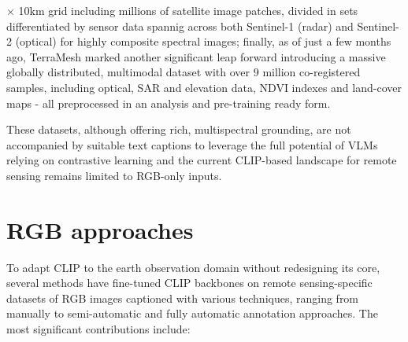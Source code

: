 \documentclass[a4paper, oneside, english]{sapthesis} %
\begin{document}
$\times$ 10km grid including millions of satellite image patches, divided in sets differentiated by sensor data spannig across both Sentinel-1 (radar) and Sentinel-2 (optical) for highly composite spectral images; finally, as of just a few months ago, TerraMesh \cite{blumenstiel2025terramesh} marked another significant leap forward introducing a massive globally distributed, multimodal dataset with over $9$ million co-registered samples, including optical, SAR and elevation data, NDVI indexes and land-cover maps - all preprocessed in an analysis and pre-training ready form.

These datasets, although offering rich, multispectral grounding, are not accompanied by suitable text captions to leverage the full potential of VLMs relying on contrastive learning and the current CLIP-based landscape for remote sensing remains limited to RGB-only inputs.


\section{RGB approaches}

To adapt CLIP to the earth observation domain without redesigning its core, several methods have fine-tuned CLIP backbones on remote sensing-specific datasets of RGB images captioned with various techniques, ranging from manually to semi-automatic and fully automatic annotation approaches. The most significant contributions include:
\end{document}
